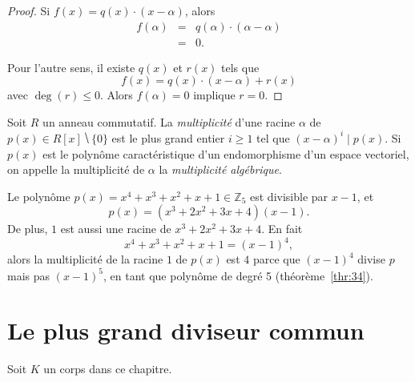 \begin{proof}
  Si $f(x) = q(x) \cdot (x - \alpha)$, alors
  \begin{eqnarray*}
    \label{eq:52}
    f(\alpha) & = & q(α) \cdot (α - \alpha)\\ 
              & = & 0.
  \end{eqnarray*}

Pour l'autre sens, il existe $q(x)$ et $r(x)$ tels que
\begin{displaymath}
  f(x) = q(x) \cdot (x - \alpha) + r(x)
\end{displaymath}
avec $\deg(r) \leq 0$. Alors $f(\alpha) = 0$ implique $r=0$. 
\end{proof}


\begin{definition}
  \label{def:41}
  Soit $R$ un anneau commutatif. 
  La \emph{multiplicité} d'une racine $α$ de $p(x) ∈ R[x] ⧹\{0\}$ est le plus grand entier $i≥1$ tel que $ (x-α)^i \mid p(x)$. Si $p(x)$ est le polynôme caractéristique d'un endomorphisme d'un espace vectoriel, on appelle la multiplicité de $α$ la \emph{multiplicité algébrique}. 
\end{definition} 


\begin{example}  
  \label{exe:45}
  Le polynôme  $p(x) = x^4 + x^3 + x^2 + x + 1  ∈ℤ_5$  est divisible par $x-1$, et
  \begin{displaymath}
    p(x)  = (x^3 + 2x^2 + 3x + 4)  (x-1). 
  \end{displaymath}
  De plus, $1$ est aussi une racine de $x^3 + 2x^2 + 3x + 4$. En fait 
  \begin{displaymath}
    x^4 + x^3 + x^2 + x + 1 = (x-1)^4,
  \end{displaymath}
  alors la multiplicité de la racine $1$ de $p(x)$ est $4$ parce que $(x-1)^4$ divise $p$ mais pas $(x-1)^5$, en tant que polynôme de degré 5 (théorème~\ref{thr:34}).   
\end{example}




\section{Le plus grand diviseur commun}
\label{sec:fact-de-polyn}

Soit $K$ un corps dans ce chapitre. 

